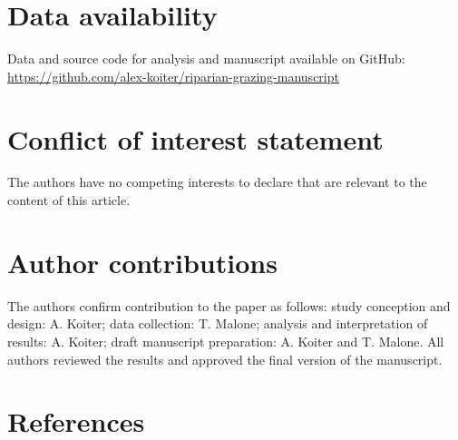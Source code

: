 \documentclass[
]{agujournal2019}
\begin{document}
\section*{Data availability}\label{data-availability}

Data and source code for analysis and manuscript available on GitHub:
\url{https://github.com/alex-koiter/riparian-grazing-manuscript}

\section*{Conflict of interest
statement}\label{conflict-of-interest-statement}

The authors have no competing interests to declare that are relevant to
the content of this article.

\section*{Author contributions}\label{author-contributions}

The authors confirm contribution to the paper as follows: study
conception and design: A. Koiter; data collection: T. Malone; analysis
and interpretation of results: A. Koiter; draft manuscript preparation:
A. Koiter and T. Malone. All authors reviewed the results and approved
the final version of the manuscript.

\section*{References}\label{references}
\end{document}
